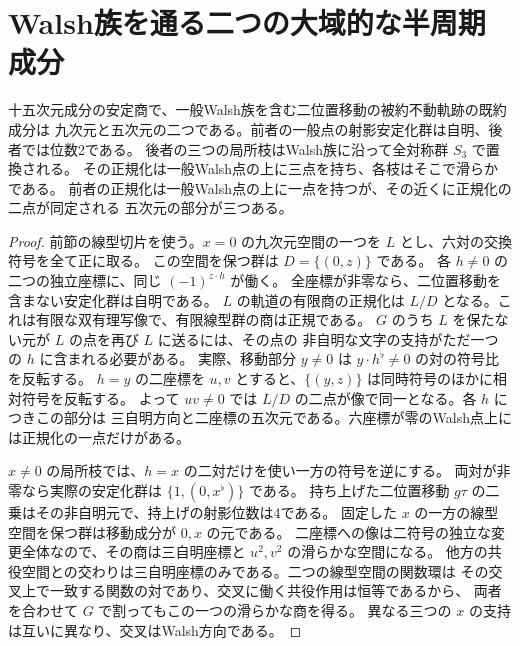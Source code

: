 \section{Walsh族を通る二つの大域的な半周期成分}
\label{sec:half-period-components}
\begin{theorem}\label{thm:half-period-components}
十五次元成分の安定商で、一般Walsh族を含む二位置移動の被約不動軌跡の既約成分は
九次元と五次元の二つである。前者の一般点の射影安定化群は自明、後者では位数2である。
後者の三つの局所枝はWalsh族に沿って全対称群 $S_3$ で置換される。
その正規化は一般Walsh点の上に三点を持ち、各枝はそこで滑らかである。
前者の正規化は一般Walsh点の上に一点を持つが、その近くに正規化の二点が同定される
五次元の部分が三つある。
\end{theorem}
\begin{proof}
前節の線型切片を使う。$x=0$ の九次元空間の一つを $L$ とし、六対の交換符号を全て正に取る。
この空間を保つ群は $D=\{(0,z)\}$ である。
各 $h\ne0$ の二つの独立座標に、同じ $(-1)^{z\cdot h}$ が働く。
全座標が非零なら、二位置移動を含まない安定化群は自明である。
$L$ の軌道の有限商の正規化は $L/D$ となる。これは有限な双有理写像で、有限線型群の商は正規である。
$G$ のうち $L$ を保たない元が $L$ の点を再び $L$ に送るには、その点の
非自明な文字の支持がただ一つの $h$ に含まれる必要がある。
実際、移動部分 $y\ne0$ は $y\cdot h^\flat\ne0$ の対の符号比を反転する。
$h=y$ の二座標を $u,v$ とすると、$\{(y,z)\}$ は同時符号のほかに相対符号を反転する。
よって $uv\ne0$ では $L/D$ の二点が像で同一となる。各 $h$ につきこの部分は
三自明方向と二座標の五次元である。六座標が零のWalsh点上には正規化の一点だけがある。

$x\ne0$ の局所枝では、$h=x$ の二対だけを使い一方の符号を逆にする。
両対が非零なら実際の安定化群は $\{1,(0,x^\flat)\}$ である。
持ち上げた二位置移動 $g\tau$ の二乗はその非自明元で、持上げの射影位数は4である。
固定した $x$ の一方の線型空間を保つ群は移動成分が $0,x$ の元である。
二座標への像は二符号の独立な変更全体なので、その商は三自明座標と $u^2,v^2$ の滑らかな空間になる。
他方の共役空間との交わりは三自明座標のみである。二つの線型空間の関数環は
その交叉上で一致する関数の対であり、交叉に働く共役作用は恒等であるから、
両者を合わせて $G$ で割ってもこの一つの滑らかな商を得る。
異なる三つの $x$ の支持は互いに異なり、交叉はWalsh方向である。


\end{proof}
